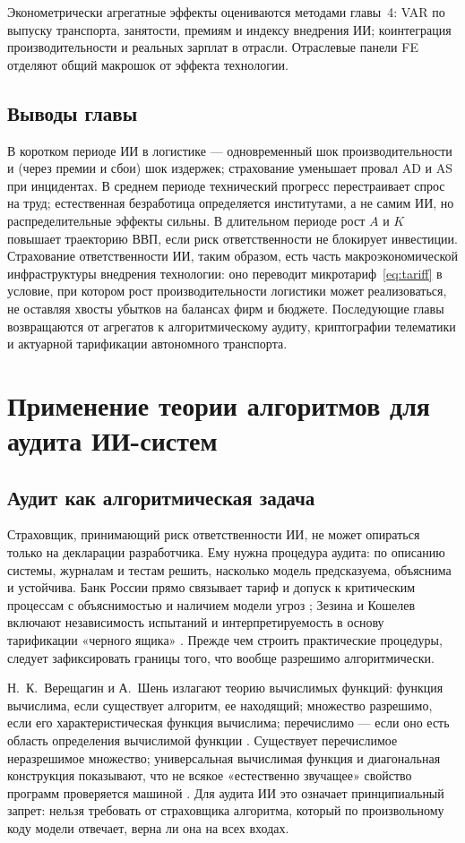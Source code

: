 \documentclass[a4paper,14pt]{extarticle}
\begin{document}
Эконометрически агрегатные эффекты оцениваются методами главы~4: VAR по выпуску транспорта, занятости, премиям и индексу внедрения ИИ; коинтеграция производительности и реальных зарплат в отрасли. Отраслевые панели FE отделяют общий макрошок от эффекта технологии.

\subsection{Выводы главы}

В коротком периоде ИИ в логистике --- одновременный шок производительности и (через премии и сбои) шок издержек; страхование уменьшает провал AD и AS при инцидентах. В среднем периоде технический прогресс перестраивает спрос на труд; естественная безработица определяется институтами, а не самим ИИ, но распределительные эффекты сильны. В длительном периоде рост $A$ и $K$ повышает траекторию ВВП, если риск ответственности не блокирует инвестиции. Страхование ответственности ИИ, таким образом, есть часть макроэкономической инфраструктуры внедрения технологии: оно переводит микротариф~\eqref{eq:tariff} в условие, при котором рост производительности логистики может реализоваться, не оставляя хвосты убытков на балансах фирм и бюджете. Последующие главы возвращаются от агрегатов к алгоритмическому аудиту, криптографии телематики и актуарной тарификации автономного транспорта.


\section{Применение теории алгоритмов для аудита ИИ-систем}

\subsection{Аудит как алгоритмическая задача}

Страховщик, принимающий риск ответственности ИИ, не может опираться только на декларации разработчика. Ему нужна процедура аудита: по описанию системы, журналам и тестам решить, насколько модель предсказуема, объяснима и устойчива. Банк России прямо связывает тариф и допуск к критическим процессам с объяснимостью и наличием модели угроз \cite{cbr}; Зезина и Кошелев включают независимость испытаний и интерпретируемость в основу тарификации «черного ящика» \cite{zezina}. Прежде чем строить практические процедуры, следует зафиксировать границы того, что вообще разрешимо алгоритмически.

Н.~К.~Верещагин и А.~Шень излагают теорию вычислимых функций: функция вычислима, если существует алгоритм, ее находящий; множество разрешимо, если его характеристическая функция вычислима; перечислимо --- если оно есть область определения вычислимой функции \cite{vereshchagin}. Существует перечислимое неразрешимое множество; универсальная вычислимая функция и диагональная конструкция показывают, что не всякое «естественно звучащее» свойство программ проверяется машиной \cite{vereshchagin}. Для аудита ИИ это означает принципиальный запрет: нельзя требовать от страховщика алгоритма, который по произвольному коду модели отвечает, верна ли она на всех входах.
\end{document}
